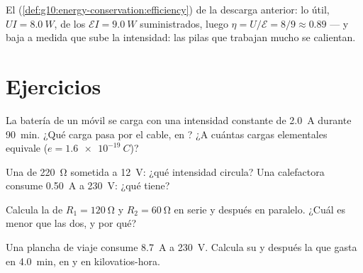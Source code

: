 \begin{example}\label{ex:g11:circuits-and-power:efficiency}
El  (\cref{def:g10:energy-conservation:efficiency}) de la
descarga anterior: lo útil, $UI = \qty{8.0}{W}$, de los
$\mathcal{E}I = \qty{9.0}{W}$ suministrados, luego
$\eta = U/\mathcal{E} = 8/9 \approx 0.89$ --- y baja a medida que sube
la intensidad: las pilas que trabajan mucho se calientan.
\end{example}

\section{Ejercicios}

\begin{exercise}[$\star$]\label{exo:g11:circuits-and-power:1}
La batería de un móvil se carga con una intensidad constante de
\qty{2.0}{A} durante \qty{90}{min}. ¿Qué carga pasa por el cable, en
? ¿A cuántas cargas elementales equivale
($e = \qty{1.6e-19}{C}$)?
\end{exercise}

\begin{exercise}[$\star$]\label{exo:g11:circuits-and-power:2}
Una  de \qty{220}{\ohm} sometida a \qty{12}{V}: ¿qué
intensidad circula? Una  calefactora consume \qty{0.50}{A} a
\qty{230}{V}: ¿qué  tiene?
\end{exercise}

\begin{exercise}[$\star$]\label{exo:g11:circuits-and-power:3}
Calcula la  de $R_1 = \qty{120}{\ohm}$ y
$R_2 = \qty{60}{\ohm}$ en serie y después en paralelo. ¿Cuál es menor
que las dos, y por qué?
\end{exercise}

\begin{exercise}[$\star$]\label{exo:g11:circuits-and-power:4}
Una plancha de viaje consume \qty{8.7}{A} a \qty{230}{V}. Calcula su
 y después la  que gasta en \qty{4.0}{min}, en  y
en kilovatios-hora.
\end{exercise}

